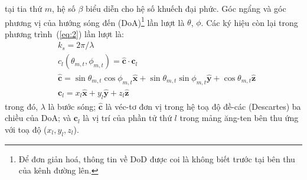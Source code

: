 tại tia thứ $m$, hệ số $\beta$ biểu diễn cho hệ số khuếch đại phức. Góc ngẩng và góc phương vị của hướng sóng đến (DoA)\footnote{Để đơn giản hoá, thông tin về DoD được coi là không biết trước tại bên thu của kênh đường lên.} lần lượt là  $\theta$, $\phi$. Các ký hiệu còn lại trong phương trình~(\ref{eq:2}) lần lượt là:
\begin{equation}
    \begin{aligned}
        &k_s = 2\pi/\lambda \\
        &c_l(\theta_{m, t}, \phi_{m, t}) = \widehat{\boldsymbol{c}} \cdot \boldsymbol{c}_l \\
        &\widehat{\boldsymbol{c}}=\sin \theta_{m, t} \cos \phi_{m, t} \widehat{\boldsymbol{x}}+\sin \theta_{m, t} \sin \phi_{m, t} \widehat{\boldsymbol{y}}+\cos \theta_{m, t} \widehat{\boldsymbol{z}} \\
        &\boldsymbol{c}_l=x_{l} \widehat{\boldsymbol{x}}+y_{l} \widehat{\boldsymbol{y}}+z_{l} \hat{\boldsymbol{z}}
    \end{aligned}
\end{equation}
trong đó, $\lambda$ là bước sóng; $\widehat{\boldsymbol{c}}$ là véc-tơ đơn vị trong hệ toạ độ đề-các (Descartes) ba chiều của DoA; và $\boldsymbol{c}_l$ là vị trí của phần tử thứ $l$ trong mảng ăng-ten bên thu ứng với toạ độ ($x_l, y_l, z_l$).

